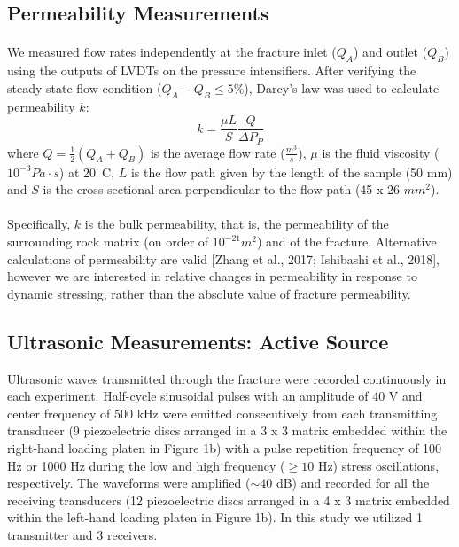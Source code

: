 \documentclass[letterpaper,10pt]{article}
\begin{document}
	
	\subsection{Permeability Measurements}
	\paragraph{} We measured flow rates independently at the fracture inlet ($Q_A$) and outlet ($Q_B$) using the outputs of LVDTs on the pressure intensifiers. After verifying the steady state flow condition ($Q_{A} - Q_{B}  \leq 5 \% $), Darcy’s law was used to calculate permeability $k$:
	\begin{equation} \label{eq:perm}
		k = \frac{\mu L}{S} \frac{Q}{\Delta P_P}
	\end{equation}
	where $Q = \frac{1}{2} (Q_A + Q_B )$ is the average flow rate ($\frac{m^3}{s}$), $\mu$ is the fluid viscosity ($10^{-3} Pa\cdot s$) at 20\textdegree\ C, $L$ is the flow path given by the length of the sample (50 mm) and $S$ is the cross sectional area perpendicular to the flow path (45 x 26 $mm^2$).
	\paragraph{} Specifically, $k$ is the bulk permeability, that is, the permeability of the surrounding rock matrix (on order of $10^{-21} m^2$) and of the fracture. Alternative calculations of permeability are valid [Zhang et al., 2017; Ishibashi et al., 2018], however we are interested in relative changes in permeability in response to dynamic stressing, rather than the absolute value of fracture permeability.
	
	
	\subsection{Ultrasonic Measurements: Active Source}
	Ultrasonic waves transmitted through the fracture were recorded continuously in each experiment. Half-cycle sinusoidal pulses with an amplitude of 40 V and center frequency of 500 kHz were emitted consecutively from each transmitting transducer (9 piezoelectric discs arranged in a 3 x 3 matrix embedded within the right-hand loading platen in Figure 1b) with a pulse repetition frequency of 100 Hz or 1000 Hz during the low and high frequency ($\geq 10$ Hz) stress oscillations, respectively. The waveforms were amplified ($\sim 40$ dB) and recorded for all the receiving transducers (12 piezoelectric discs arranged in a 4 x 3 matrix embedded within the left-hand loading platen in Figure 1b). In this study we utilized 1 transmitter and 3 receivers. 
	
\end{document}
